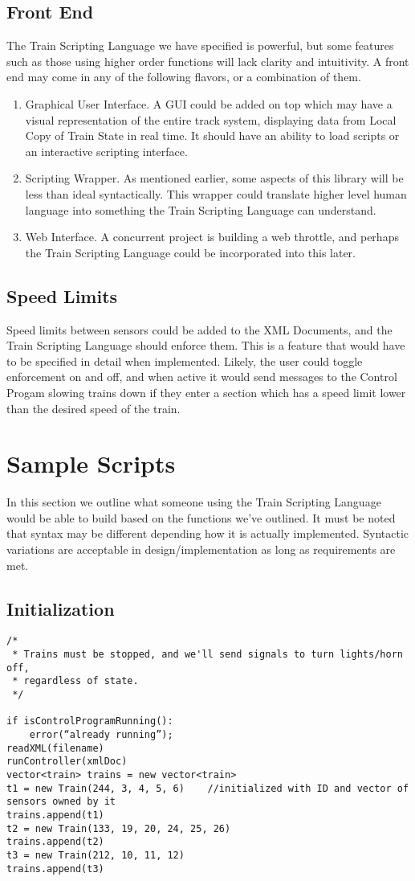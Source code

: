 \documentclass[a4paper,11pt,notitlepage]{article}
\def\TSL{Train Scripting Language\xspace}
\def\CS{Control Progam\xspace}
\def\LC{Local Copy of Train State\xspace}
\begin{document}
\subsection{Front End}
The \TSL we have specified is powerful, but some features such as those using higher order functions will lack clarity and intuitivity. A front end may come in any of the following flavors, or a combination of them.
\begin{enumerate}
	\item Graphical User Interface. A GUI could be added on top which may have a visual representation of the entire track system, displaying data from \LC in real time. It should have an ability to load scripts or an interactive scripting interface.
	\item Scripting Wrapper. As mentioned earlier, some aspects of this library will be less than ideal syntactically. This wrapper could translate higher level human language into something the \TSL can understand.
	\item Web Interface. A concurrent project is building a web throttle, and perhaps the \TSL could be incorporated into this later.
\end{enumerate}
\subsection{Speed Limits}
Speed limits between sensors could be added to the XML Documents, and the \TSL should enforce them. This is a feature that would have to be specified in detail when implemented. Likely, the user could toggle enforcement on and off, and when active it would send messages to the \CS slowing trains down if they enter a section which has a speed limit lower than the desired speed of the train.

\newpage
\section{Sample Scripts}
In this section we outline what someone using the \TSL would be able to build based on the functions we've outlined. It must be noted that syntax may be different depending how it is actually implemented. Syntactic variations are acceptable in design/implementation as long as requirements are met.

\subsection{Initialization}
\begin{verbatim}
/*
 * Trains must be stopped, and we'll send signals to turn lights/horn off,
 * regardless of state.
 */

if isControlProgramRunning():
    error(“already running”);
readXML(filename)
runController(xmlDoc)
vector<train> trains = new vector<train>
t1 = new Train(244, 3, 4, 5, 6)    //initialized with ID and vector of sensors owned by it
trains.append(t1)
t2 = new Train(133, 19, 20, 24, 25, 26)
trains.append(t2)
t3 = new Train(212, 10, 11, 12)
trains.append(t3)
\end{verbatim}
\end{document}
